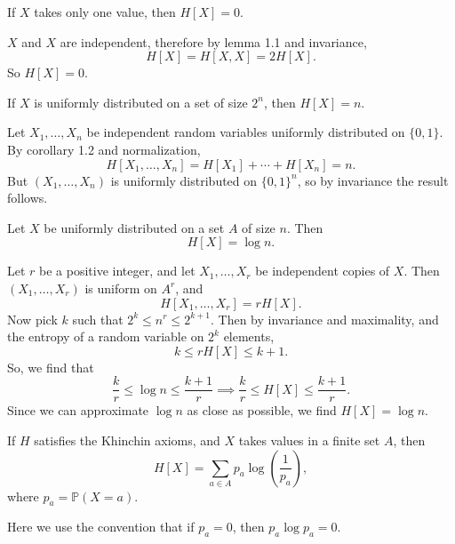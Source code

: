 \documentclass[12pt]{article}
\begin{document}
\begin{lemma}
	If $X$ takes only one value, then $H[X] = 0$.
\end{lemma}

\begin{proofbox}
	$X$ and $X$ are independent, therefore by lemma 1.1 and invariance,
	\[
		H[X] = H[X,X] = 2H[X].
	\]
	So $H[X] = 0$.
\end{proofbox}

\begin{proposition}
	If $X$ is uniformly distributed on a set of size $2^{n}$, then $H[X] = n$.
\end{proposition}

\begin{proofbox}
	Let $X_1, \ldots, X_n$ be independent random variables uniformly distributed on $\{0, 1\}$. By corollary 1.2 and normalization,
	\[
		H[X_1, \ldots, X_n] = H[X_1] + \cdots + H[X_n] = n.
	\]
	But $(X_1, \ldots, X_n)$ is uniformly distributed on $\{0, 1\}^{n}$, so by invariance the result follows.
\end{proofbox}


\begin{proposition}
	Let $X$ be uniformly distributed on a set $A$ of size $n$. Then
	\[
		H[X] = \log n.
	\]
\end{proposition}

\begin{proofbox}
	Let $r$ be a positive integer, and let $X_1, \ldots, X_r$ be independent copies of $X$. Then $(X_1, \ldots, X_r)$ is uniform on $A^{r}$, and
	\[
		H[X_1, \ldots, X_r] = r H[X].
	\]
	Now pick $k$ such that $2^{k} \leq n^{r} \leq 2^{k+1}$. Then by invariance and maximality, and the entropy of a random variable on $2^{k}$ elements,
	\[
		k \leq r H[X] \leq k+1.
	\]
	So, we find that
	\[
		\frac{k}{r} \leq \log n \leq \frac{k+1}{r} \implies \frac{k}{r} \leq H[X] \leq \frac{k+1}{r}.
	\]
	Since we can approximate $\log n$ as close as possible, we find $H[X] = \log n$.
\end{proofbox}

\begin{theorem}[Khinchin]
	If $H$ satisfies the Khinchin axioms, and $X$ takes values in a finite set $A$, then
	\[
		H[X] = \sum_{a \in A} p_a \log \left(\frac{1}{p_a} \right),
	\]
	where $p_a = \mathbb{P}(X = a)$.
\end{theorem}

Here we use the convention that if $p_a = 0$, then $p_a \log p_a = 0$.
\end{document}
